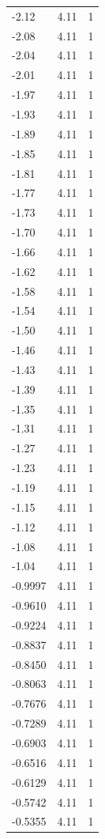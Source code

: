 \begin{longtable}{lrr}
  -2.12 & 4.11 & 1 \\
  -2.08 & 4.11 & 1 \\
  -2.04 & 4.11 & 1 \\
  -2.01 & 4.11 & 1 \\
  -1.97 & 4.11 & 1 \\
  -1.93 & 4.11 & 1 \\
  -1.89 & 4.11 & 1 \\
  -1.85 & 4.11 & 1 \\
  -1.81 & 4.11 & 1 \\
  -1.77 & 4.11 & 1 \\
  -1.73 & 4.11 & 1 \\
  -1.70 & 4.11 & 1 \\
  -1.66 & 4.11 & 1 \\
  -1.62 & 4.11 & 1 \\
  -1.58 & 4.11 & 1 \\
  -1.54 & 4.11 & 1 \\
  -1.50 & 4.11 & 1 \\
  -1.46 & 4.11 & 1 \\
  -1.43 & 4.11 & 1 \\
  -1.39 & 4.11 & 1 \\
  -1.35 & 4.11 & 1 \\
  -1.31 & 4.11 & 1 \\
  -1.27 & 4.11 & 1 \\
  -1.23 & 4.11 & 1 \\
  -1.19 & 4.11 & 1 \\
  -1.15 & 4.11 & 1 \\
  -1.12 & 4.11 & 1 \\
  -1.08 & 4.11 & 1 \\
  -1.04 & 4.11 & 1 \\
  -0.9997 & 4.11 & 1 \\
  -0.9610 & 4.11 & 1 \\
  -0.9224 & 4.11 & 1 \\
  -0.8837 & 4.11 & 1 \\
  -0.8450 & 4.11 & 1 \\
  -0.8063 & 4.11 & 1 \\
  -0.7676 & 4.11 & 1 \\
  -0.7289 & 4.11 & 1 \\
  -0.6903 & 4.11 & 1 \\
  -0.6516 & 4.11 & 1 \\
  -0.6129 & 4.11 & 1 \\
  -0.5742 & 4.11 & 1 \\
  -0.5355 & 4.11 & 1 \\

\end{longtable}
